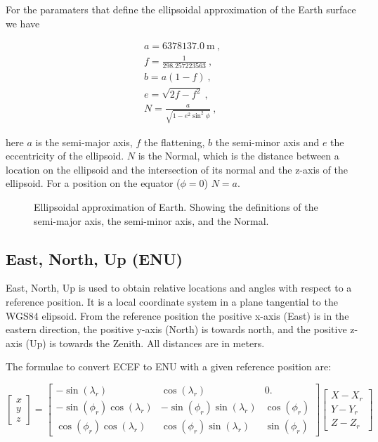 \noindent
For the paramaters that define the ellipsoidal approximation of the
Earth surface we have

\begin{equation}
    \label{eq:wgs84}
    \begin{array}{l}
        a = \SI{6378137.0}{\meter} \ , \\
        f = \frac{1}{298.257223563} \ , \\
        b = a (1 - f) \ , \\
        e = \sqrt{2 f - f^2} \ , \\
        N = \frac{a}{\sqrt{1 - e^2 \sin^2 \phi}} \ ,
    \end{array}
\end{equation}

\noindent here $a$ is the semi-major axis, $f$ the flattening, $b$ the
semi-minor axis and $e$ the eccentricity of the ellipsoid. $N$ is the
Normal, which is the distance between a location on the ellipsoid and
the intersection of its normal and the z-axis of the ellipsoid. For a
position on the equator ($\phi = 0$) $N = a$.

\begin{figure}
    \centering
    
    \caption{Ellipsoidal approximation of Earth. Showing the definitions
             of the semi-major axis, the semi-minor axis, and the Normal.}
    \label{fig:ellipsoid}
\end{figure}


\subsection{East, North, Up (ENU)}

East, North, Up is used to obtain relative locations and angles with
respect to a reference position. It is a local coordinate system in a
plane tangential to the WGS84 elipsoid. From the reference position the
positive x-axis (East) is in the eastern direction, the positive y-axis
(North) is towards north, and the positive z-axis (Up) is towards the
Zenith. All distances are in meters.

The formulae to convert ECEF to ENU with a given reference position are:

\begin{equation}
    \begin{bmatrix}
    x \\ y \\ z
    \end{bmatrix}
    =
    \begin{bmatrix}
                 -\sin(\lambda_r) &               \cos(\lambda_r) &           0. \\
    -\sin(\phi_r) \cos(\lambda_r) & -\sin(\phi_r) \sin(\lambda_r) & \cos(\phi_r) \\
     \cos(\phi_r) \cos(\lambda_r) &  \cos(\phi_r) \sin(\lambda_r) & \sin(\phi_r)
    \end{bmatrix}
    \begin{bmatrix}
    X - X_r \\ Y - Y_r \\ Z - Z_r
    \end{bmatrix}
\end{equation}

